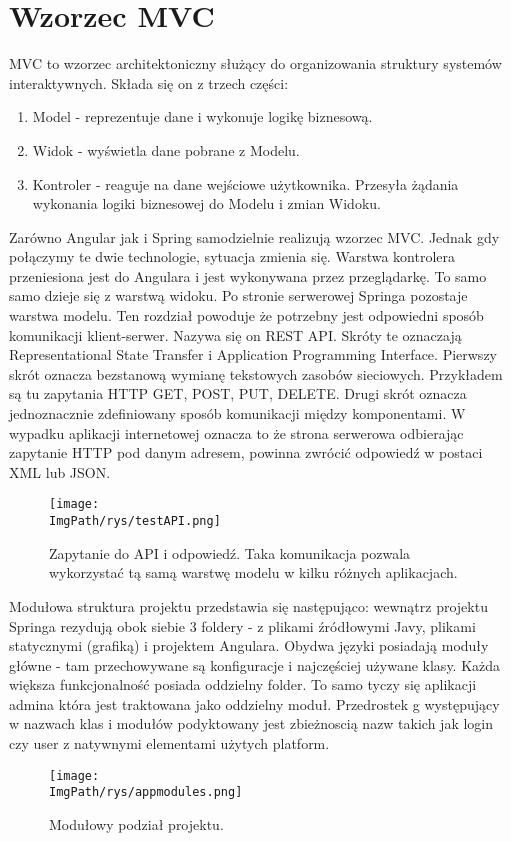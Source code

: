 \documentclass[a4paper,12pt,twoside,openany]{report}
\newcommand{\ImgPath}{.}
\begin{document}
\section{Wzorzec MVC}
MVC to wzorzec architektoniczny służący do organizowania struktury systemów interaktywnych. Składa się on z trzech części:
	\begin{enumerate}
		\item Model - reprezentuje dane i wykonuje logikę biznesową.
		\item Widok - wyświetla dane pobrane z Modelu.
		\item Kontroler - reaguje na dane wejściowe użytkownika. Przesyła żądania wykonania logiki biznesowej do Modelu i zmian Widoku. 
	\end{enumerate}
Zarówno Angular jak i Spring samodzielnie realizują wzorzec MVC. Jednak gdy połączymy te dwie technologie, sytuacja zmienia się. Warstwa kontrolera przeniesiona jest do Angulara i jest wykonywana przez przeglądarkę. To samo samo dzieje się z warstwą widoku. Po stronie serwerowej Springa pozostaje warstwa modelu. Ten rozdział powoduje że potrzebny jest odpowiedni sposób komunikacji klient-serwer. Nazywa się on REST API. Skróty te oznaczają Representational State Transfer i Application Programming Interface. Pierwszy skrót oznacza bezstanową wymianę tekstowych zasobów sieciowych. Przykładem są tu zapytania HTTP GET, POST, PUT, DELETE. Drugi skrót oznacza jednoznacznie zdefiniowany sposób komunikacji między komponentami. W wypadku aplikacji internetowej oznacza to że strona serwerowa odbierając zapytanie HTTP pod danym adresem, powinna zwrócić odpowiedź w postaci XML lub JSON.
		\begin{figure}[!htbp]
			\begin{center}
				\centering
				\texttt{[image: \\ImgPath/rys/testAPI.png]}
			\end{center}
			\caption{Zapytanie do API i odpowiedź. Taka komunikacja pozwala wykorzystać tą samą warstwę modelu w kilku różnych aplikacjach.}
			\label{UMLTS}
		\end{figure}
Modułowa struktura projektu przedstawia się następująco: wewnątrz projektu Springa rezydują obok siebie 3 foldery - z plikami źródłowymi Javy, plikami statycznymi (grafiką) i projektem Angulara. Obydwa języki posiadają moduły główne - tam przechowywane są konfiguracje i najczęściej używane klasy. Każda większa funkcjonalność posiada oddzielny folder. To samo tyczy się aplikacji admina która jest traktowana jako oddzielny moduł. Przedrostek g występujący w nazwach klas i modułów podyktowany jest zbieżnoscią nazw takich jak login czy user z natywnymi elementami użytych platform.
		\begin{figure}[!htbp]
			\begin{center}
				\centering
				\texttt{[image: \\ImgPath/rys/appmodules.png]}
			\end{center}
			\caption{Modułowy podział projektu.}
			\label{UMLTS}
		\end{figure}
\end{document}
